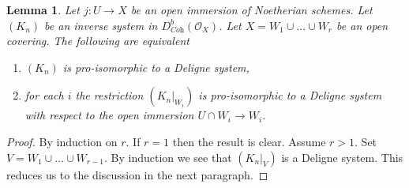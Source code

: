 \documentclass[10pt,a4paper]{amsart}
\theoremstyle{plain}
\newtheorem{lemma}[subsection]{Lemma}
\theoremstyle{definition}
\theoremstyle{remark}
\numberwithin{equation}{subsection}
\begin{document}
\begin{lemma}
\label{lemma-characterize-extension-by-zero}
Let $j : U \to X$ be an open immersion of Noetherian schemes. Let
$(K_n)$ be an inverse system in $D^b_{\textit{Coh}}(\mathcal{O}_X)$.
Let $X = W_1 \cup \ldots \cup W_r$ be an open covering.
The following are equivalent
\begin{enumerate}
\item $(K_n)$ is pro-isomorphic to a Deligne system,
\item for each $i$ the restriction $(K_n|_{W_i})$
is pro-isomorphic to a Deligne system with respect to
the open immersion $U \cap W_i \to W_i$.
\end{enumerate}
\end{lemma}

\begin{proof}
By induction on $r$. If $r = 1$ then the result is clear.
Assume $r > 1$. Set $V = W_1 \cup \ldots \cup W_{r - 1}$.
By induction we see that $(K_n|_V)$ is a Deligne system.
This reduces us to the discussion in the next paragraph.


\end{proof}
\end{document}
